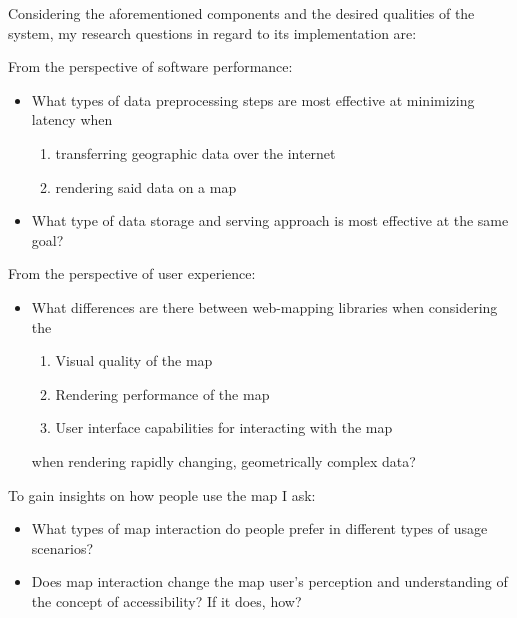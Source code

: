 

Considering the aforementioned components
and the desired qualities of the system,
my research questions in regard to its implementation are:

From the perspective of software performance:
\begin{itemize}
	\item What types of data preprocessing steps are most effective at minimizing
	latency when
	\begin{enumerate}
		\item transferring geographic data over the internet
		\item rendering said data on a map
	\end{enumerate}
	\item What type of data storage and serving approach is most effective at the same goal?
\end{itemize}

From the perspective of user experience:
\begin{itemize}
	\item What differences are there between web-mapping libraries when considering the
	\begin{enumerate}
		\item Visual quality of the map
		\item Rendering performance of the map
		\item User interface capabilities for interacting with the map
	\end{enumerate}
	when rendering rapidly changing, geometrically complex data?
\end{itemize}

To gain insights on how people use the map I ask:  %

\begin{itemize}
	\item What types of map interaction do people prefer in different types of usage scenarios?
	\item Does map interaction change the map user's perception and understanding of the concept of accessibility? If it does, how?
\end{itemize}

